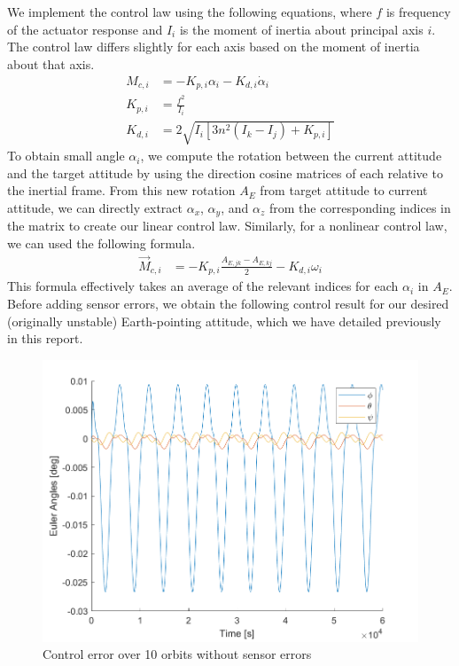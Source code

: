 We implement the control law using the following equations, where $f$ is frequency of the actuator response and $I_{i}$ is the moment of inertia about principal axis $i$. The control law differs slightly for each axis based on the moment of inertia about that axis.
\begin{align*}
    M_{c,i} &= -K_{p,i} \alpha_{i} - K_{d,i} \Dot{\alpha}_{i} \\
    K_{p,i} &= \frac{f^{2}}{I_{i}} \\
    K_{d,i} &= 2 \sqrt{I_{i} \left[ 3 n^{2} (I_{k} - I_{j}) + K_{p,i} \right]}
\end{align*}
To obtain small angle $\alpha_{i}$, we compute the rotation between the current attitude and the target attitude by using the direction cosine matrices of each relative to the inertial frame. From this new rotation $A_{E}$ from target attitude to current attitude, we can directly extract $\alpha_{x}$, $\alpha_{y}$, and $\alpha_{z}$ from the corresponding indices in the matrix to create our linear control law. Similarly, for a nonlinear control law, we can used the following formula.
\begin{align*}
    \Vec{M}_{c,i} &= -K_{p,i} \frac{A_{E,jk} - A_{E,kj}}{2} - K_{d,i} \omega_{i}
\end{align*}
This formula effectively takes an average of the relevant indices for each $\alpha_{i}$ in $A_{E}$. Before adding sensor errors, we obtain the following control result for our desired (originally unstable) Earth-pointing attitude, which we have detailed previously in this report.

\begin{figure}[H]
\centering
\includegraphics[scale=0.7]{Images/ps9_problem3_controlError_nonlinear_GT.png}
\caption{Control error over 10 orbits without sensor errors}
\label{fig:ps9_problem3_controlError_nonlinear_GT}
\end{figure}

